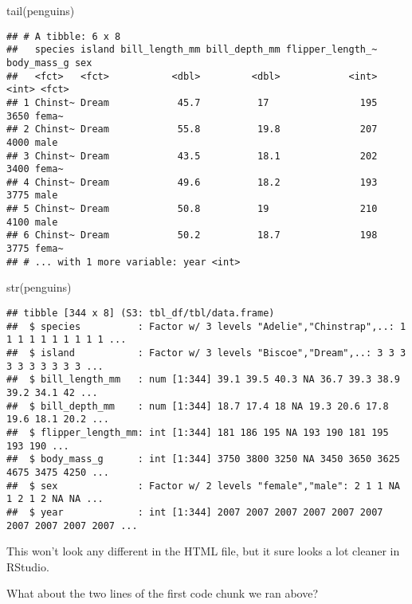 \documentclass[
]{book}
\newenvironment{Shaded}{\begin{snugshade}}{\end{snugshade}}
\newcommand{\FunctionTok}[1]{\textcolor[rgb]{0.00,0.00,0.00}{#1}}
\newcommand{\NormalTok}[1]{#1}
\begin{document}
\begin{Shaded}
\begin{Highlighting}[]
\FunctionTok{tail}\NormalTok{(penguins)}
\end{Highlighting}
\end{Shaded}

\begin{verbatim}
## # A tibble: 6 x 8
##   species island bill_length_mm bill_depth_mm flipper_length_~ body_mass_g sex  
##   <fct>   <fct>           <dbl>         <dbl>            <int>       <int> <fct>
## 1 Chinst~ Dream            45.7          17                195        3650 fema~
## 2 Chinst~ Dream            55.8          19.8              207        4000 male 
## 3 Chinst~ Dream            43.5          18.1              202        3400 fema~
## 4 Chinst~ Dream            49.6          18.2              193        3775 male 
## 5 Chinst~ Dream            50.8          19                210        4100 male 
## 6 Chinst~ Dream            50.2          18.7              198        3775 fema~
## # ... with 1 more variable: year <int>
\end{verbatim}

\begin{Shaded}
\begin{Highlighting}[]
\FunctionTok{str}\NormalTok{(penguins)}
\end{Highlighting}
\end{Shaded}

\begin{verbatim}
## tibble [344 x 8] (S3: tbl_df/tbl/data.frame)
##  $ species          : Factor w/ 3 levels "Adelie","Chinstrap",..: 1 1 1 1 1 1 1 1 1 1 ...
##  $ island           : Factor w/ 3 levels "Biscoe","Dream",..: 3 3 3 3 3 3 3 3 3 3 ...
##  $ bill_length_mm   : num [1:344] 39.1 39.5 40.3 NA 36.7 39.3 38.9 39.2 34.1 42 ...
##  $ bill_depth_mm    : num [1:344] 18.7 17.4 18 NA 19.3 20.6 17.8 19.6 18.1 20.2 ...
##  $ flipper_length_mm: int [1:344] 181 186 195 NA 193 190 181 195 193 190 ...
##  $ body_mass_g      : int [1:344] 3750 3800 3250 NA 3450 3650 3625 4675 3475 4250 ...
##  $ sex              : Factor w/ 2 levels "female","male": 2 1 1 NA 1 2 1 2 NA NA ...
##  $ year             : int [1:344] 2007 2007 2007 2007 2007 2007 2007 2007 2007 2007 ...
\end{verbatim}

This won't look any different in the HTML file, but it sure looks a lot cleaner in RStudio.

What about the two lines of the first code chunk we ran above?
\end{document}
